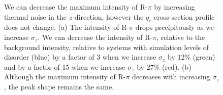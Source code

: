 \documentclass[journal=jpcbfk,manuscript=article]{achemso}
\begin{document}
\begin{figure}[!htb]
\begin{subfigure}{0.45\textwidth}
  \caption{}\label{fig:rpi_xsection_vs_zsigma}
  \end{subfigure}
  \caption{We can decrease the maximum intensity of R-$\pi$ by increasing
  thermal noise in the $z$-direction, however the $q_r$ cross-section profile does
  not change. (a) The intensity of R-$\pi$ drops precipitously as we increase
  $\sigma_z$. We can decrease the intensity of R-$\pi$, relative to the
  background intensity, relative to systems with simulation levels of disorder (blue)
  by a factor of 3 when we
  increase $\sigma_z$ by 12\% (green) and by a factor of 15 when we increase
  $\sigma_z$ by 27\% (red). (b) Although the maximum intensity of R-$\pi$
  decreases with increasing $\sigma_z$, the peak shape remains the same.}\label{fig:znoise}
  \end{figure}
  
\end{document}
